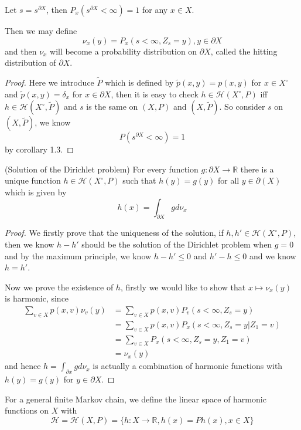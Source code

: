 \documentclass[lang=en, color=blue, ]{elegantbook}
\newcommand{\R}{\mathbb{R}}
\newcommand{\Har}{\mathcal{H}}
\begin{document}
\begin{definition}
    Let $s = s^{\partial X}$, then $P_x(s^{\partial X} < \infty) = 1$ for any $x\in X$.\par
    Then we may define
    \[\nu_x(y)  = P_x(s<\infty, Z_s = y), y\in\partial X\]
    and then $\nu_x$ will become a probability distribution on $\partial X$, called the hitting distribution of $\partial X$.
\end{definition}
\begin{proof}
    Here we introduce $\tilde{P}$ which is defined by $\tilde{p}(x,y) = p(x,y)$ for $x\in X^{\circ}$ and $\tilde{p}(x,y) = \delta_x$ for $x\in\partial X$, then it is easy to check $h\in \Har(X^{\circ},P)$ iff $h\in \Har(X^{\circ},\tilde{P})$ and $s$ is the same on $(X,P)$ and $(X,\tilde{P})$. So consider $s$ on $(X,\tilde{P})$, we know
    \[P(s^{\partial X} < \infty) = 1\]
    by corollary 1.3.
\end{proof}

\begin{theorem}
    (Solution of the Dirichlet problem) For every function $g:\partial X\to \R$ there is a unique function $h\in \Har(X^{\circ},P)$ such that $h(y) = g(y)$ for all $y\in \partial(X)$ which is given by
    \[
    h(x) = \int_{\partial X} gd\nu_x
    \]
\end{theorem}
\begin{proof}
    We firstly prove that the uniqueness of the solution, if $h,h' \in \Har(X^{\circ}, P)$, then we know $h - h'$ should be the solution of the  Dirichlet problem when $g = 0$ and by the maximum principle, we know $h-h' \leq 0$ and $h'-h\leq 0$ and we know $ h = h'$.\par
    Now we prove the existence of $h$, firstly we would like to show that $x\mapsto \nu_x(y)$ is harmonic, since
    \[
    \begin{aligned}
    \sum\limits_{v\in X}p(x,v)\nu_v(y) &= \sum\limits_{v\in X}p(x,v)P_v(s<\infty, Z_s = y)\\ &= \sum\limits_{v\in X}p(x,v)P_x(s<\infty, Z_s = y|Z_1 = v) \\ &= \sum\limits_{v\in X}P_x(s<\infty, Z_s = y, Z_1 = v) \\ &= \nu_x(y)
    \end{aligned}
    \]
    and hence $h = \int_{\partial x}gd\nu_x$ is actually a combination of harmonic functions with $h(y) = g(y)$ for $y\in \partial X$.
\end{proof}

\begin{definition}
    For a general finite Markov chain, we define the linear space of harmonic functions on $X$ with
    \[\Har = \Har(X,P) = \{h:X\to\R, h(x) = Ph(x), x\in X\}\]
\end{definition}
\end{document}
